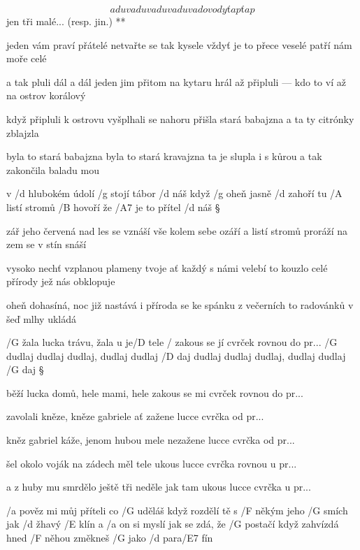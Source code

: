 \R \[ a duva duva duva duva do vody ťap ťap \]
   jen tři malé...  (resp. jin.) **

jeden vám praví přátelé
netvařte se tak kysele
vždyť je to přece veselé
patří nám moře celé \s

a tak pluli dál a dál
jeden jim přitom na kytaru hrál
až připluli --- kdo to ví
až na ostrov korálový \s

když připluli k ostrovu
vyšplhali se nahoru
přišla stará babajzna
a ta ty citrónky zblajzla \s

byla to stará babajzna
byla to stará kravajzna
ta je slupla i s kůrou
a tak zakončila baladu mou




v /d hlubokém údolí /g stojí tábor /d náš
když /g oheň jasně /d zahoří
tu /A listí stromů /B hovoří
že /A7 je to přítel /d náš \S

zář jeho červená nad les se vznáší
vše kolem sebe ozáří
a listí stromů proráží
na zem se v stín snáší \s

vysoko nechť vzplanou plameny tvoje
ať každý s námi velebí
to kouzlo celé přírody
jež nás obklopuje \s

oheň dohasíná, noc již nastává
i příroda se ke spánku
z večerních to radovánků
v šeď mlhy ukládá




/G žala lucka trávu, žala u je/D tele
/ zakous se jí cvrček rovnou do pr...
/G dudlaj dudlaj dudlaj, dudlaj dudlaj /D daj
dudlaj dudlaj dudlaj, dudlaj dudlaj /G daj \S

běží lucka domů, hele mami, hele
zakous se mi cvrček rovnou do pr... \s

zavolali kněze, kněze gabriele
ať zažene lucce cvrčka od pr... \s

kněz gabriel káže, jenom hubou mele
nezažene lucce cvrčka od pr... \s

šel okolo voják na zádech měl tele
ukous lucce cvrčka rovnou u pr... \s

a z huby mu smrdělo ještě tři neděle
jak tam ukous lucce cvrčka u pr... \s




/a pověz mi můj příteli co /G uděláš když rozdělí
tě s /F někým jeho /G smích jak /d žhavý /E klín
a /a on si myslí jak se zdá, že /G postačí když zahvízdá
hned /F něhou změkneš /G jako /d para/E7 fín \s

